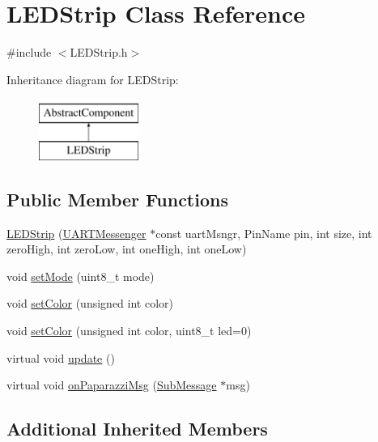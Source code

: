 \hypertarget{class_l_e_d_strip}{}\section{L\+E\+D\+Strip Class Reference}
\label{class_l_e_d_strip}


{\ttfamily \#include $<$L\+E\+D\+Strip.\+h$>$}

Inheritance diagram for L\+E\+D\+Strip\+:\begin{figure}[H]
\begin{center}
\leavevmode
\includegraphics[height=2.000000cm]{class_l_e_d_strip}
\end{center}
\end{figure}
\subsection*{Public Member Functions}
\begin{DoxyCompactItemize}
\item 
\hyperlink{class_l_e_d_strip_a746e420e05c5d6c45eb2f74eaf5928fc}{L\+E\+D\+Strip} (\hyperlink{class_u_a_r_t_messenger}{U\+A\+R\+T\+Messenger} $\ast$const uart\+Msngr, Pin\+Name pin, int size, int zero\+High, int zero\+Low, int one\+High, int one\+Low)
\item 
void \hyperlink{class_l_e_d_strip_abf199367f3caaf9730262c4e7bef6bc1}{set\+Mode} (uint8\+\_\+t mode)
\item 
void \hyperlink{class_l_e_d_strip_a310b381acdd83a01ddb6e2debebbbc7c}{set\+Color} (unsigned int color)
\item 
void \hyperlink{class_l_e_d_strip_a1f9d9c2784c9ad893163f7f17e603ce7}{set\+Color} (unsigned int color, uint8\+\_\+t led=0)
\item 
virtual void \hyperlink{class_l_e_d_strip_abc57d90870bb0e9c0d05e7ba6ca76c95}{update} ()
\item 
virtual void \hyperlink{class_l_e_d_strip_af9708cc14c0e3f75e5b3c268b398f436}{on\+Paparazzi\+Msg} (\hyperlink{struct_sub_message}{Sub\+Message} $\ast$msg)
\end{DoxyCompactItemize}
\subsection*{Additional Inherited Members}


